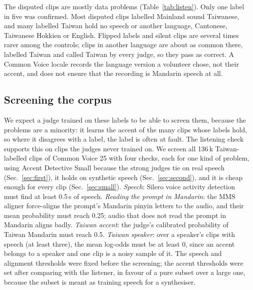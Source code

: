 \documentclass{Interspeech}
\begin{document}
The disputed clips are mostly data problems (Table~\ref{tab:listen}). Only one label in five was confirmed. Most disputed clips labelled Mainland sound Taiwanese, and many labelled Taiwan hold no speech or another language, Cantonese, Taiwanese Hokkien or English. Flipped labels and silent clips are several times rarer among the controls; clips in another language are about as common there, labelled Taiwan and called Taiwan by every judge, so they pass as correct. A Common Voice locale records the language version a volunteer chose, not their accent, and does not ensure that the recording is Mandarin speech at all.

\subsection{Screening the corpus}
\label{sec:screen}

We expect a judge trained on these labels to be able to screen them, because the problems are a minority: it learns the accent of the many clips whose labels hold, so where it disagrees with a label, the label is often at fault. The listening check supports this on clips the judges never trained on. We screen all 136\,k Taiwan-labelled clips of Common Voice 25 with four checks, each for one kind of problem, using Accent Detective Small because the strong judges tie on real speech (Sec.~\ref{sec:first}), it holds on synthetic speech (Sec.~\ref{sec:second}), and it is cheap enough for every clip (Sec.~\ref{sec:small}). \emph{Speech}: Silero voice activity detection must find at least 0.5\,s of speech. \emph{Reading the prompt in Mandarin}: the MMS aligner force-aligns the prompt's Mandarin pinyin letters to the audio, and their mean probability must reach 0.25; audio that does not read the prompt in Mandarin aligns badly. \emph{Taiwan accent}: the judge's calibrated probability of Taiwan Mandarin must reach 0.5. \emph{Taiwan speaker}: over a speaker's clips with speech (at least three), the mean log-odds must be at least 0, since an accent belongs to a speaker and one clip is a noisy sample of it. The speech and alignment thresholds were fixed before the screening; the accent thresholds were set after comparing with the listener, in favour of a pure subset over a large one, because the subset is meant as training speech for a synthesiser.
\end{document}
